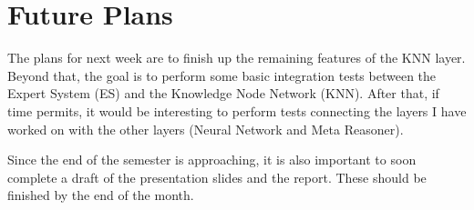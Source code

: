 \documentclass[]{article}
\begin{document}
	\section{Future Plans}
	
	The plans for next week are to finish up the remaining features of the KNN layer. Beyond that, the goal is to perform some basic integration tests between the Expert System (ES) and the Knowledge Node Network (KNN). After that, if time permits, it would be interesting to perform tests connecting the layers I have worked on with the other layers (Neural Network and Meta Reasoner).
	
	Since the end of the semester is approaching, it is also important to soon complete a draft of the presentation slides and the report. These should be finished by the end of the month.
	
	
	{}
	
\end{document}

